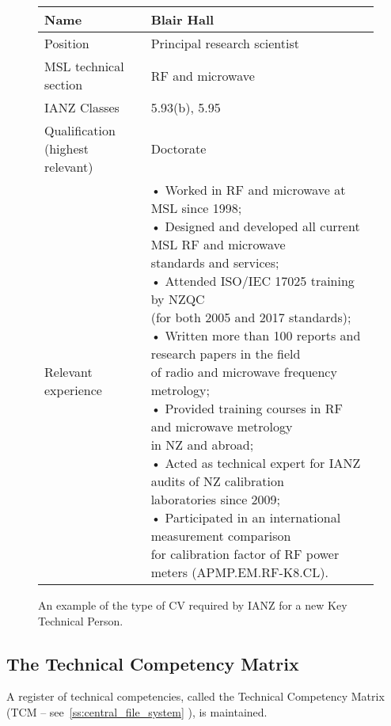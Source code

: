 \begin{figure}[ht]
\begin{center}
\begin{tabular}{|p{3.5cm}|p{10cm}|}
\hline 
\rule[-1ex]{0pt}{2.5ex} Name & Blair Hall \\ 
\hline 
\rule[-1ex]{0pt}{2.5ex} Position & Principal research scientist \\ 
\hline 
\rule[-1ex]{0pt}{2.5ex} MSL technical section & RF and microwave \\ 
\hline 
\rule[-1ex]{0pt}{2.5ex} IANZ Classes & 5.93(b), 5.95 \\ 
\hline 
\rule[-1ex]{0pt}{2.5ex} \makecell[tl]{ Qualification\\ (highest relevant)} & Doctorate \\ 
\hline 
\rule[-1ex]{0pt}{2.5ex} Relevant experience & \makecell[tl]{
• Worked in RF and microwave at MSL since 1998;\\
• Designed and developed all current MSL RF and microwave\\
 standards and services;\\
• Attended ISO/IEC 17025 training by NZQC\\ 
(for both 2005 and 2017 standards);\\
• Written more than 100 reports and research papers in the field\\ 
of radio and microwave frequency metrology;\\
• Provided training courses in RF and microwave metrology\\ 
in NZ and abroad;\\
• Acted as technical expert for IANZ audits of NZ calibration\\ 
laboratories since 2009;\\
• Participated in an international measurement comparison\\ 
for calibration factor of RF power meters (APMP.EM.RF-K8.CL).} \\ 
\hline 
\end{tabular} 
\end{center}
\caption{An example of the type of CV required by IANZ for a new Key Technical Person.}
\label{f:ktp_cv}
\end{figure}

\subsection{The Technical Competency Matrix}
A register of technical competencies, called the Technical Competency Matrix (TCM -- see~\ref{ss:central_file_system} ), is maintained. 

